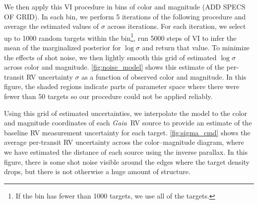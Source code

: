\documentclass[modern, letterpaper]{aastex631}
\newcommand{\project}[1]{\textsl{#1}}
\newcommand{\Gaia}{\project{Gaia}}
\begin{document}
We then apply this VI procedure in bins of color and magnitude (ADD SPECS OF GRID).
In each bin, we perform 5 iterations of the following procedure and average the estimated values of $\sigma$ across iterations.
For each iteration, we select up to 1000 random targets within the bin\footnote{If the bin has fewer than 1000 targets, we use all of the targets.}, run 5000 steps of VI to infer the mean of the marginalized posterior for $\log \sigma$ and return that value.
To minimize the effects of shot noise, we then lightly smooth this grid of estimated $\log \sigma$ across color and magnitude.
\autoref{fig:noise_model} shows this estimate of the per-transit RV uncertainty $\sigma$ as a function of observed color and magnitude.
In this figure, the shaded regions indicate parts of parameter space where there were fewer than 50 targets so our procedure could not be applied reliably.


Using this grid of estimated uncertainties, we interpolate the model to the color and magnitude coordinates of each \Gaia\ RV source to provide an estimate of the baseline RV measurement uncertainty for each target.
\autoref{fig:sigma_cmd} shows the average per-transit RV uncertainty across the color--magnitude diagram, where we have estimated the distance of each source using the inverse parallax.
In this figure, there is some shot noise visible around the edges where the target density drops, but there is not otherwise a huge amount of structure.

\end{document}
